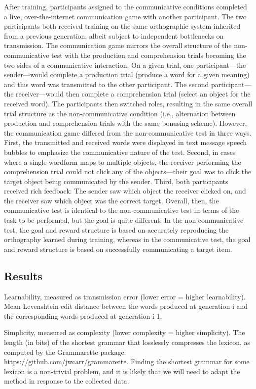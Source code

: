 \documentclass[doc,biblatex]{apa7}
\begin{document}
After training, participants assigned to the communicative conditions completed a live, over-the-internet communication game with another participant. The two participants both received training on the same orthographic system inherited from a previous generation, albeit subject to independent bottlenecks on transmission. The communication game mirrors the overall structure of the non-communicative test with the production and comprehension trials becoming the two sides of a communicative interaction. On a given trial, one participant---the sender---would complete a production trial (produce a word for a given meaning) and this word was transmitted to the other participant. The second participant---the receiver---would then complete a comprehension trial (select an object for the received word). The participants then switched roles, resulting in the same overall trial structure as the non-communicative condition (i.e., alternation between production and comprehension trials with the same bonusing scheme). However, the communication game differed from the non-communicative test in three ways. First, the transmitted and received words were displayed in text message speech bubbles to emphasize the communicative nature of the test. Second, in cases where a single wordform maps to multiple objects, the receiver performing the comprehension trial could not click any of the objects---their goal was to click the target object being communicated by the sender. Third, both participants received rich feedback: The sender saw which object the receiver clicked on, and the receiver saw which object was the correct target. Overall, then, the communicative test is identical to the non-communicative test in terms of the task to be performed, but the goal is quite different: In the non-communicative test, the goal and reward structure is based on accurately reproducing the orthography learned during training, whereas in the communicative test, the goal and reward structure is based on successfully communicating a target item.

\subsection{Results}

Learnability, measured as transmission error (lower error = higher learnability). Mean Levenshtein edit distance between the words produced at generation i and the corresponding words produced at generation i-1.

Simplicity, measured as complexity (lower complexity = higher simplicity). The length (in bits) of the shortest grammar that losslessly compresses the lexicon, as computed by the Grammarette package: https://github.com/jwcarr/grammarette. Finding the shortest grammar for some lexicon is a non-trivial problem, and it is likely that we will need to adapt the method in response to the collected data.
\end{document}
